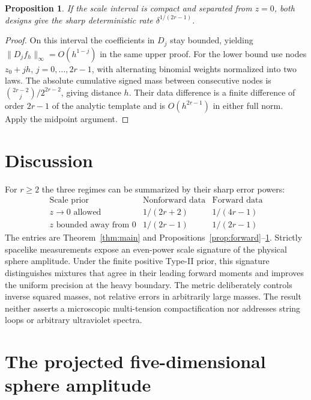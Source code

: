 \documentclass[11pt]{article}
\newtheorem{proposition}{Proposition}
\begin{document}
\begin{proposition}\label{prop:compact}
If the scale interval is compact and separated from \(z=0\), both designs give the sharp deterministic rate \(\delta^{1/(2r-1)}\).
\end{proposition}
\begin{proof}
On this interval the coefficients in \(D_j\) stay bounded, yielding \(\|D_j f_h\|_\infty=O(h^{1-j})\) in the same upper proof. For the lower bound use nodes \(z_0+jh\), \(j=0,\ldots,2r-1\), with alternating binomial weights normalized into two laws. The absolute cumulative signed mass between consecutive nodes is \(\binom{2r-2}{j}/2^{2r-2}\), giving distance \(h\). Their data difference is a finite difference of order \(2r-1\) of the analytic template and is \(O(h^{2r-1})\) in either full norm. Apply the midpoint argument.
\end{proof}

\section{Discussion}
For \(r\ge2\) the three regimes can be summarized by their sharp error powers:
\[
 \begin{array}{c|c|c}
 \text{Scale prior} & \text{Nonforward data} & \text{Forward data}\\ \hline
 z\to0\text{ allowed} & 1/(2r+2) & 1/(4r-1)\\
 z\text{ bounded away from }0 & 1/(2r-1) & 1/(2r-1)
 \end{array}
\]
The entries are Theorem~\ref{thm:main} and Propositions~\ref{prop:forward}--\ref{prop:compact}.
Strictly spacelike measurements expose an even-power scale signature of the physical sphere amplitude. Under the finite positive Type-II prior, this signature distinguishes mixtures that agree in their leading forward moments and improves the uniform precision at the heavy boundary. The metric deliberately controls inverse squared masses, not relative errors in arbitrarily large masses. The result neither asserts a microscopic multi-tension compactification nor addresses string loops or arbitrary ultraviolet spectra.

\appendix
\section{The projected five-dimensional sphere amplitude}
\label{d5app:physical}
\end{document}
